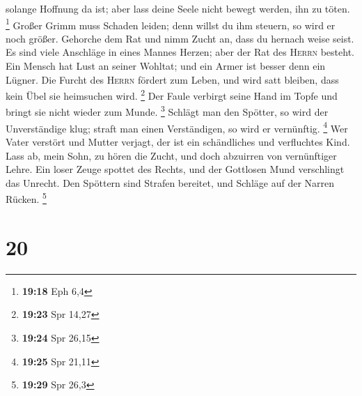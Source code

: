 solange Hoffnung da ist; aber lass deine Seele nicht bewegt werden, ihn
zu töten. \footnote{\textbf{19:18} Eph 6,4}  Großer Grimm
muss Schaden leiden; denn willst du ihm steuern, so wird er noch größer.
 Gehorche dem Rat und nimm Zucht an, dass du hernach
weise seist.  Es sind viele Anschläge in eines Mannes
Herzen; aber der Rat des \textsc{Herrn} besteht.  Ein
Mensch hat Lust an seiner Wohltat; und ein Armer ist besser denn ein
Lügner.  Die Furcht des \textsc{Herrn} fördert zum Leben,
und wird satt bleiben, dass kein Übel sie heimsuchen wird. \footnote{\textbf{19:23}
  Spr 14,27}  Der Faule verbirgt seine Hand im Topfe und
bringt sie nicht wieder zum Munde. \footnote{\textbf{19:24} Spr 26,15}
 Schlägt man den Spötter, so wird der Unverständige klug;
straft man einen Verständigen, so wird er vernünftig. \footnote{\textbf{19:25}
  Spr 21,11}  Wer Vater verstört und Mutter verjagt, der
ist ein schändliches und verfluchtes Kind.  Lass ab, mein
Sohn, zu hören die Zucht, und doch abzuirren von vernünftiger Lehre.
 Ein loser Zeuge spottet des Rechts, und der Gottlosen
Mund verschlingt das Unrecht.  Den Spöttern sind Strafen
bereitet, und Schläge auf der Narren Rücken. \footnote{\textbf{19:29}
  Spr 26,3}

\hypertarget{section-8}{%
\section{20}\label{section-8}}

